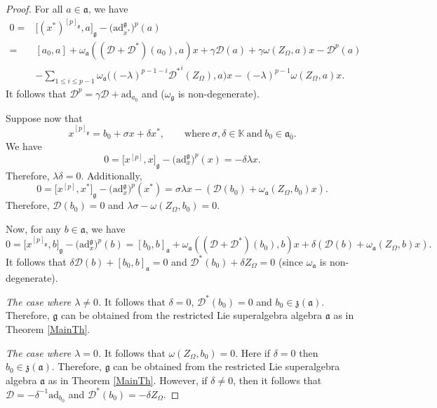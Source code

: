 \documentclass[10pt,a4paper]{amsart}
\numberwithin{equation}{section}
\begin{document}
\begin{proof}
For all $a\in \mathfrak{a}$, we have
\begin{align*}
0={}&\big[(x^*)^{[p]_\mathfrak{g}},a\big]_\mathfrak{g}-\bigl(\mathrm{ad}_{x^*}^\mathfrak{g}\bigr)^p(a)\\
 ={}& [a_0,a]+ \omega_\mathfrak{a}(({\mathscr D}+{\mathscr D}^*)(a_0),a)x+\gamma {\mathscr D}(a) +\gamma \omega(Z_\Omega, a)x-{\mathscr D}^{p}(a) \\
 &- \sum_{1\leq i \leq p-1}\omega_\mathfrak{a}\bigl((-\lambda)^{p-1-i} {\mathscr D^*}^{i} (Z_\Omega),a\bigr)x - (-\lambda)^{p-1} \omega(Z_\Omega,a)x.
\end{align*}
It follows that ${\mathscr D}^p=\gamma {\mathscr D} +\mathrm{ad}_{a_0}$ and  ($\omega_\mathfrak{g}$ is non-degenerate).

Suppose now that
\[%
x^{[p]_\mathfrak{g}}=b_0+\sigma x+\delta x^*,\qquad \text{where}\ \sigma,\delta\in \mathbb{K}\ \text{and}\ b_0\in \mathfrak{a}_{\bar 0}.
\]
We have
\[
0=\big[x^{[p]},x\big]_\mathfrak{g}-\bigl(\mathrm{ad}_{x}^\mathfrak{g}\bigr)^p(x)=- \delta \lambda x.
\]
Therefore, $\lambda \delta =0$. Additionally,
\[
0=\big[x^{[p]},x^*\big]_\mathfrak{g}-\bigl(\mathrm{ad}_{x}^\mathfrak{g}\bigr)^p(x^*)= \sigma \lambda x- ({\mathscr D}(b_0)+\omega_\mathfrak{a} (Z_\Omega, b_0)x).
\]
Therefore, ${\mathscr D}(b_0)=0$ and $\lambda \sigma-\omega(Z_\Omega,b_0)=0$.

Now, for any $b\in \mathfrak{a}$, we have
\[
0=\big[x^{[p]_\mathfrak{g}},b\big]_\mathfrak{g}-\bigl(\mathrm{ad}_x^\mathfrak{g}\bigr)^{p}(b)=[b_0,b]_\mathfrak{a}+\omega_\mathfrak{a}(({\mathscr D}+{\mathscr D}^*)(b_0), b)x+ \delta ( {\mathscr D}(b)+ \omega_\mathfrak{a}(Z_\Omega, b)x).
\]
It follows that $\delta {\mathscr D}(b)+[b_0,b]_\mathfrak{a}=0$ and ${\mathscr D}^*(b_0)+ \delta Z_\Omega=0$ (since $\omega_\mathfrak{a}$ is non-degenerate).

\textit{The case where $\lambda\not=0$.} It follows that $\delta=0$, ${\mathscr D}^*(b_0)=0$ and $b_0\in \mathfrak{z}(\mathfrak{a})$. Therefore, $\mathfrak{g}$ can be obtained from the restricted Lie superalgebra algebra $\mathfrak{a}$ as in Theorem \ref{MainTh}.

\textit{The case where $\lambda=0$.} It follows that $\omega(Z_\Omega, b_0)=0$. Here if $\delta=0$ then $b_0\in \mathfrak{z}(\mathfrak{a})$. Therefore, $\mathfrak{g}$ can be obtained from the restricted Lie superalgebra algebra $\mathfrak{a}$ as in Theorem \ref{MainTh}. However, if $\delta\not =0$, then it follows that ${\mathscr D}=-\delta^{-1} \mathrm{ad}_{b_0}$ and ${\mathscr D}^*(b_0)=-\delta Z_\Omega$.
\end{proof}
\end{document}
